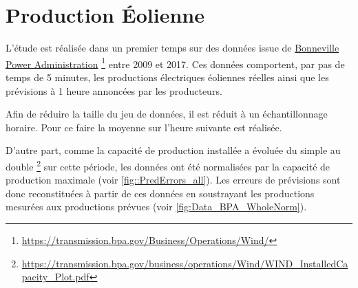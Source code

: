 \documentclass[12pt]{report}
\begin{document}
\section{Production Éolienne}
L'étude est réalisée dans un premier temps sur des données issue de \href{https://transmission.bpa.gov/Business/Operations/Wind/}{Bonneville Power Administration}  \footnote{\url{https://transmission.bpa.gov/Business/Operations/Wind/}} entre 2009 et 2017. Ces données comportent, par pas de temps de 5 minutes, les productions électriques éoliennes réelles ainsi que les prévisions à 1 heure annoncées par les producteurs.

Afin de réduire la taille du jeu de données, il est réduit à un échantillonnage horaire. Pour ce faire la moyenne sur l'heure suivante est réalisée.

D'autre part, comme la capacité de production installée a évoluée du simple au double  \footnote{\url{https://transmission.bpa.gov/business/operations/Wind/WIND_InstalledCapacity_Plot.pdf}} sur cette période, les données ont été normalisées par la capacité de production maximale (voir \ref{fig::PredErrors_all}). Les erreurs de prévisions sont donc reconstituées à partir de ces données en soustrayant les productions mesurées aux productions prévues (voir \ref{fig:Data_BPA_WholeNorm}).
\end{document}
